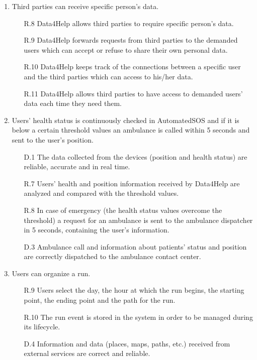 \documentclass[a4paper]{article}
\begin{document}
\begin{enumerate}[label*=\bf{G.\arabic*}]
        
        \item Third parties can receive specific person's data.
                
        \begin{enumerate}
                \item[R.8] Data4Help allows third parties to require specific person's data. 
                \item [R.9] Data4Help forwards requests from third parties to the demanded users which can accept or refuse to share their own personal data.
                \item [R.10] Data4Help keeps track of the connections between a specific user and the third parties which can access to his/her data.
                \item [R.11] Data4Help allows third parties to have access to demanded users' data each time they need them.
            \end{enumerate}
                
            
        \item Users' health status is continuously checked in AutomatedSOS and if it is below a certain threshold values an ambulance is called within 5 seconds and sent to the user's position.
    
        \begin{enumerate}
            \item [D.1] The data collected from the devices (position and health status) are reliable, accurate and in real time.
            \item [R.7] Users' health and position information received by Data4Help are analyzed and compared with the threshold values.
            \item [R.8] In case of emergency (the health status values overcome the threshold) a request for an ambulance is sent to the ambulance dispatcher in 5 seconds, containing the user's information.
            \item [D.3] Ambulance call and information about patients' status and position are correctly dispatched to the ambulance contact center.
        \end{enumerate}
        
        \item Users can organize a run.
        
        \begin{enumerate}
            \item [R.9] Users select the day, the hour at which the run begins, the starting point, the ending point and the path for the run.
            \item [R.10] The run event is stored in the system in order to be managed during its lifecycle.
            \item [D.4] Information and data (places, maps, paths, etc.) received from external services are correct and reliable.
        \end{enumerate}
        

\end{enumerate}
\end{document}
